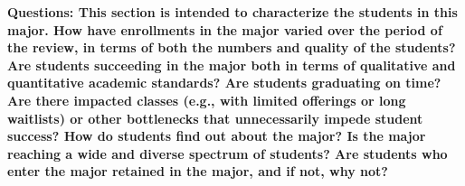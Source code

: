 \documentclass[12pt]{article}
\begin{document}
{\bf Questions: This section is intended to characterize the students in this major. How have enrollments in the major varied over the period of the review, in terms of both the numbers and quality of the students? Are students succeeding in the major both in terms of qualitative and quantitative academic standards? Are students graduating on time? Are there impacted classes (e.g., with limited offerings or long waitlists) or other bottlenecks that unnecessarily impede student success? How do students find out about the major?  Is the major reaching a wide and diverse spectrum of students? Are students who enter the major retained in the major, and if not, why not?}\\[3pt]

\end{document}
